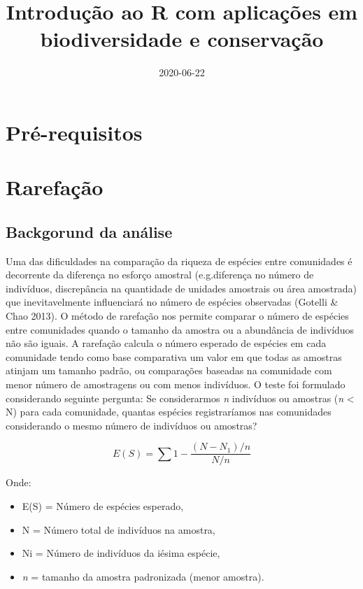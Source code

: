 \documentclass[
]{book}
\title{Introdução ao R com aplicações em biodiversidade e conservação}
\author{}
\date{\vspace{-2.5em}2020-06-22}
\begin{document}
\maketitle

{
\setcounter{tocdepth}{1}
\tableofcontents
}
\hypertarget{pruxe9-requisitos}{%
\chapter{Pré-requisitos}\label{pruxe9-requisitos}}

\hypertarget{rarefauxe7uxe3o}{%
\chapter{Rarefação}\label{rarefauxe7uxe3o}}

\hypertarget{backgorund-da-anuxe1lise}{%
\section{Backgorund da análise}\label{backgorund-da-anuxe1lise}}

Uma das dificuldades na comparação da riqueza de espécies entre comunidades é decorrente da diferença no esforço amostral (e.g.diferença no número de indivíduos, discrepância na quantidade de unidades amostrais ou área amostrada) que inevitavelmente influenciará no número de espécies observadas (Gotelli \& Chao 2013). O método de rarefação nos permite comparar o número de espécies entre comunidades quando o tamanho da amostra ou a abundância de indivíduos não são iguais. A rarefação calcula o número esperado de espécies em cada comunidade tendo como base comparativa um valor em que todas as amostras atinjam um tamanho padrão, ou comparações baseadas na comunidade com menor número de amostragens ou com menos indivíduos. O teste foi formulado considerando seguinte pergunta: Se considerarmos \emph{n} indivíduos ou amostras (\emph{n} \textless{} N) para cada comunidade, quantas espécies registraríamos nas comunidades considerando o mesmo número de indivíduos ou amostras?

\[E(S) = \sum 1 - \frac{{(N - N_1)}/{n}}{{N}/{n}}\]

Onde:

\begin{itemize}
\item
  E(S) = Número de espécies esperado,
\item
  N = Número total de indivíduos na amostra,
\item
  Ni = Número de indivíduos da iésima espécie,
\item
  \emph{n} = tamanho da amostra padronizada (menor amostra).
\end{itemize}
\end{document}
